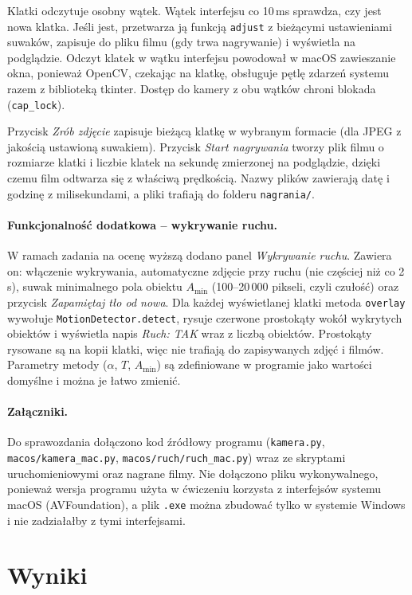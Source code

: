 Klatki odczytuje osobny wątek. Wątek interfejsu co 10\,ms sprawdza, czy jest nowa klatka. Jeśli
jest, przetwarza ją funkcją \texttt{adjust} z bieżącymi ustawieniami suwaków, zapisuje do pliku
filmu (gdy trwa nagrywanie) i wyświetla na podglądzie. Odczyt klatek w wątku interfejsu powodował
w macOS zawieszanie okna, ponieważ OpenCV, czekając na klatkę, obsługuje pętlę zdarzeń systemu
razem z biblioteką tkinter. Dostęp do kamery z obu wątków chroni blokada (\texttt{cap\_lock}).

Przycisk \emph{Zrób zdjęcie} zapisuje bieżącą klatkę w wybranym formacie (dla JPEG z jakością
ustawioną suwakiem). Przycisk \emph{Start nagrywania} tworzy plik filmu o rozmiarze klatki i liczbie
klatek na sekundę zmierzonej na podglądzie, dzięki czemu film odtwarza się z właściwą prędkością.
Nazwy plików zawierają datę i godzinę z milisekundami, a pliki trafiają do folderu
\texttt{nagrania/}.

\paragraph{Funkcjonalność dodatkowa -- wykrywanie ruchu.} W ramach zadania na ocenę wyższą dodano
panel \emph{Wykrywanie ruchu}. Zawiera on: włączenie wykrywania, automatyczne zdjęcie przy ruchu
(nie częściej niż co 2\,s), suwak minimalnego pola obiektu $A_{\min}$ (100--20\,000 pikseli, czyli
czułość) oraz przycisk \emph{Zapamiętaj tło od nowa}. Dla każdej wyświetlanej klatki metoda
\texttt{overlay} wywołuje \texttt{MotionDetector.detect}, rysuje czerwone prostokąty wokół
wykrytych obiektów i wyświetla napis \emph{Ruch: TAK} wraz z liczbą obiektów. Prostokąty rysowane
są na kopii klatki, więc nie trafiają do zapisywanych zdjęć i filmów. Parametry metody ($\alpha$,
$T$, $A_{\min}$) są zdefiniowane w programie jako wartości domyślne i można je łatwo zmienić.

\paragraph{Załączniki.} Do sprawozdania dołączono kod źródłowy programu (\texttt{kamera.py},
\texttt{macos/kamera\_mac.py}, \texttt{macos/ruch/ruch\_mac.py}) wraz ze skryptami uruchomieniowymi
oraz nagrane filmy. Nie dołączono pliku wykonywalnego, ponieważ wersja programu użyta w ćwiczeniu
korzysta z interfejsów systemu macOS (AVFoundation), a plik \texttt{.exe} można zbudować tylko
w systemie Windows i nie zadziałałby z tymi interfejsami.

\section{Wyniki}
